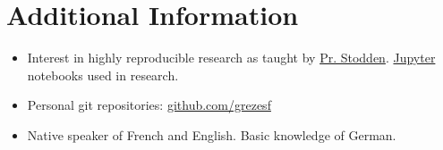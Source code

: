 \documentclass[a4paper,10pt]{article}
\begin{document}
\section{Additional Information}
    \vspace{0.2cm}
    \begin{itemize}
        \item Interest in highly reproducible research as taught by \href{http://stodden.net}{Pr. Stodden}. \href{https://jupyter.org/}{Jupyter} notebooks used in research.
        \item Personal git repositories: \href{https://github.com/grezesf}{github.com/grezesf}
        \item Native speaker of French and English. Basic knowledge of German.
    \end{itemize}
\end{document}
